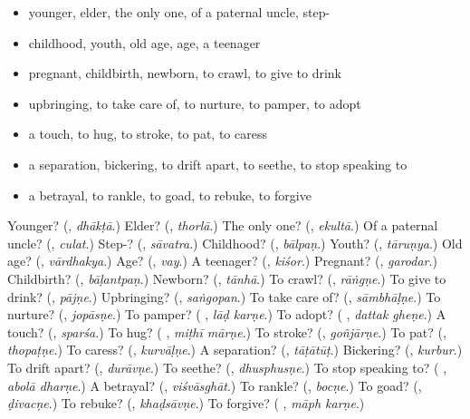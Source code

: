 \begin{itemize}
\raggedright
  \item younger, elder, the only one, of a paternal uncle, step-
  \item childhood, youth, old age, age, a teenager
  \item pregnant, childbirth, newborn, to crawl, to give to drink
  \item upbringing, to take care of, to nurture, to pamper, to adopt
  \item a touch, to hug, to stroke, to pat, to caress
  \item a separation, bickering, to drift apart, to seethe, to stop speaking to
  \item a betrayal, to rankle, to goad, to rebuke, to forgive
\end{itemize}

\begin{tcolorbox}[breakable,colback=teal!4,colframe=teal!35!black,title={Before you move on}]
Younger? (\textbf{}, \emph{dhākṭā}.) Elder? (\textbf{}, \emph{thorlā}.) The only one? (\textbf{}, \emph{ekultā}.) Of a paternal uncle? (\textbf{}, \emph{culat}.) Step-? (\textbf{}, \emph{sāvatra}.) Childhood? (\textbf{}, \emph{bālpaṇ}.) Youth? (\textbf{}, \emph{tāruṇya}.) Old age? (\textbf{}, \emph{vārdhakya}.) Age? (\textbf{}, \emph{vay}.) A teenager? (\textbf{}, \emph{kiśor}.) Pregnant? (\textbf{}, \emph{garodar}.) Childbirth? (\textbf{}, \emph{bāḷantpaṇ}.) Newborn? (\textbf{}, \emph{tānhā}.) To crawl? (\textbf{}, \emph{rāṅgṇe}.) To give to drink? (\textbf{}, \emph{pājṇe}.) Upbringing? (\textbf{}, \emph{saṅgopan}.) To take care of? (\textbf{}, \emph{sāmbhāḷṇe}.) To nurture? (\textbf{}, \emph{jopāsṇe}.) To pamper? (\textbf{ }, \emph{lāḍ karṇe}.) To adopt? (\textbf{ }, \emph{dattak gheṇe}.) A touch? (\textbf{}, \emph{sparśa}.) To hug? (\textbf{ }, \emph{miṭhī mārṇe}.) To stroke? (\textbf{}, \emph{goñjārṇe}.) To pat? (\textbf{}, \emph{thopaṭṇe}.) To caress? (\textbf{}, \emph{kurvāḷṇe}.) A separation? (\textbf{}, \emph{tāṭātūṭ}.) Bickering? (\textbf{}, \emph{kurbur}.) To drift apart? (\textbf{}, \emph{durāvṇe}.) To seethe? (\textbf{}, \emph{dhusphusṇe}.) To stop speaking to? (\textbf{ }, \emph{abolā dharṇe}.) A betrayal? (\textbf{}, \emph{viśvāsghāt}.) To rankle? (\textbf{}, \emph{bocṇe}.) To goad? (\textbf{}, \emph{ḍivacṇe}.) To rebuke? (\textbf{}, \emph{khaḍsāvṇe}.) To forgive? (\textbf{ }, \emph{māph karṇe}.)
\end{tcolorbox}
